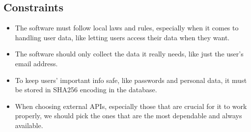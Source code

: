 \subsection{Constraints}

\begin{itemize}
    \item The software must follow local laws and rules, especially when it comes to handling user data, like letting users access their data when they want.
    \item The software should only collect the data it really needs, like just the user's email address.
    \item To keep users' important info safe, like passwords and personal data, it must be stored in SHA256 encoding in the database.
    \item When choosing external APIs, especially those that are crucial for it to work properly, we should pick the ones that are the most dependable and always available.
\end{itemize}